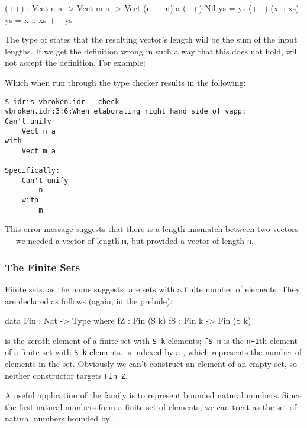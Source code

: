 \begin{code}
(++) : Vect n a -> Vect m a -> Vect (n + m) a
(++) Nil       ys = ys
(++) (x :: xs) ys = x :: xs ++ ys
\end{code}

\noindent
The type of \tFN{(++)} states that the resulting vector's length will be the sum of the input lengths.
If we get the definition wrong in such a way that this does not hold, \Idris{} will not accept the definition.
For example:


\noindent
Which when run through the \Idris{} type checker results in the following:

\begin{lstlisting}[style=stdout]
$ idris vbroken.idr --check
vbroken.idr:3:6:When elaborating right hand side of vapp:
Can't unify
	Vect n a
with
	Vect m a

Specifically:
	Can't unify
		n
	with
		m
\end{lstlisting}

\noindent
This error message suggests that there is a length mismatch between two vectors --- we needed a vector of length \texttt{m}, but provided a vector of length \texttt{n}.


\subsubsection{The Finite Sets}

Finite sets, as the name suggests, are sets with a finite number of elements.
They are declared as follows (again, in the prelude):

\begin{code}
data Fin : Nat -> Type where
   fZ : Fin (S k)
   fS : Fin k -> Fin (S k)
\end{code}

\noindent
{} is the zeroth element of a finite set with \texttt{S k} elements; \texttt{fS n} is the \texttt{n+1}th element of a finite set with \texttt{S k} elements.
 is indexed by a , which represents the number of elements in the set.
Obviously we can't construct an element of an empty set, so neither constructor targets \texttt{Fin Z}.

A useful application of the  family is to represent bounded natural numbers.
Since the first  natural numbers form a finite set of  elements, we can treat  as the set of natural numbers bounded by .

